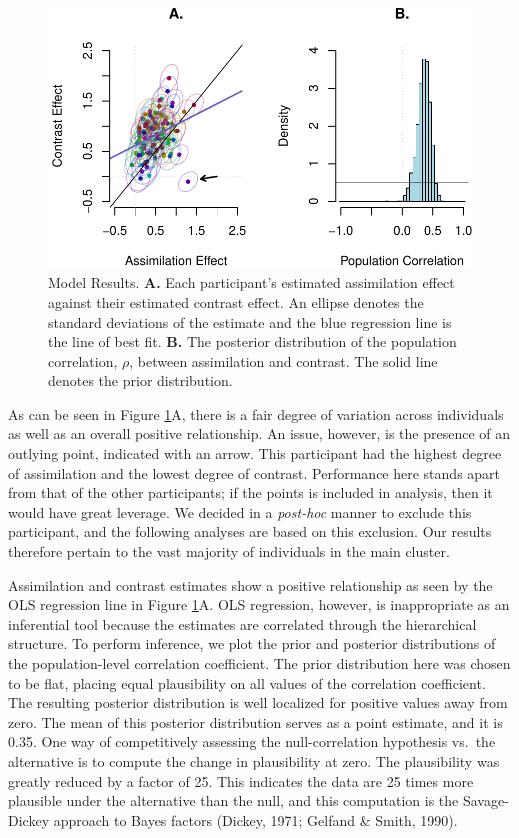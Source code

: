\documentclass[english,floatsintext,man]{apa6}
\theoremstyle{definition}
\theoremstyle{definition}
\theoremstyle{remark}
\begin{document}
\begin{figure}[htbp]
\centering
\includegraphics{paper_files/figure-latex/modelfiguresminus-1.pdf}
\caption{\label{fig:modelfiguresminus}Model Results. \textbf{A.} Each
participant's estimated assimilation effect against their estimated
contrast effect. An ellipse denotes the standard deviations of the
estimate and the blue regression line is the line of best fit.
\textbf{B.} The posterior distribution of the population correlation,
\(\rho\), between assimilation and contrast. The solid line denotes the
prior distribution.}
\end{figure}

As can be seen in Figure \ref{fig:modelfiguresminus}A, there is a fair
degree of variation across individuals as well as an overall positive
relationship. An issue, however, is the presence of an outlying point,
indicated with an arrow. This participant had the highest degree of
assimilation and the lowest degree of contrast. Performance here stands
apart from that of the other participants; if the points is included in
analysis, then it would have great leverage. We decided in a
\emph{post-hoc} manner to exclude this participant, and the following
analyses are based on this exclusion. Our results therefore pertain to
the vast majority of individuals in the main cluster.

Assimilation and contrast estimates show a positive relationship as seen
by the OLS regression line in Figure \ref{fig:modelfiguresminus}A. OLS
regression, however, is inappropriate as an inferential tool because the
estimates are correlated through the hierarchical structure. To perform
inference, we plot the prior and posterior distributions of the
population-level correlation coefficient. The prior distribution here
was chosen to be flat, placing equal plausibility on all values of the
correlation coefficient. The resulting posterior distribution is well
localized for positive values away from zero. The mean of this posterior
distribution serves as a point estimate, and it is 0.35. One way of
competitively assessing the null-correlation hypothesis vs.~the
alternative is to compute the change in plausibility at zero. The
plausibility was greatly reduced by a factor of 25. This indicates the
data are 25 times more plausible under the alternative than the null,
and this computation is the Savage-Dickey approach to Bayes factors
(Dickey, 1971; Gelfand \& Smith, 1990).
\end{document}
